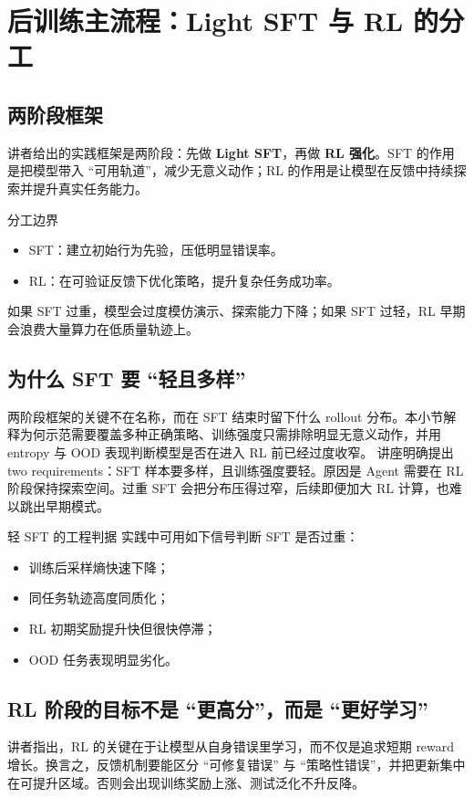 \section{后训练主流程：Light SFT 与 RL 的分工}

\subsection{两阶段框架}
讲者给出的实践框架是两阶段：先做 \textbf{Light SFT}，再做 \textbf{RL 强化}。SFT 的作用是把模型带入 ``可用轨道''，减少无意义动作；RL 的作用是让模型在反馈中持续探索并提升真实任务能力。

\begin{importantbox}{分工边界}
\begin{itemize}
    \item SFT：建立初始行为先验，压低明显错误率。
    \item RL：在可验证反馈下优化策略，提升复杂任务成功率。
\end{itemize}
如果 SFT 过重，模型会过度模仿演示、探索能力下降；如果 SFT 过轻，RL 早期会浪费大量算力在低质量轨迹上。
\end{importantbox}

\subsection{为什么 SFT 要 ``轻且多样''}
两阶段框架的关键不在名称，而在 SFT 结束时留下什么 rollout 分布。本小节解释为何示范需要覆盖多种正确策略、训练强度只需排除明显无意义动作，并用 entropy 与 OOD 表现判断模型是否在进入 RL 前已经过度收窄。
讲座明确提出 two requirements：SFT 样本要多样，且训练强度要轻。原因是 Agent 需要在 RL 阶段保持探索空间。过重 SFT 会把分布压得过窄，后续即便加大 RL 计算，也难以跳出早期模式。

\begin{knowledgebox}{轻 SFT 的工程判据}
实践中可用如下信号判断 SFT 是否过重：
\begin{itemize}
    \item 训练后采样熵快速下降；
    \item 同任务轨迹高度同质化；
    \item RL 初期奖励提升快但很快停滞；
    \item OOD 任务表现明显劣化。
\end{itemize}
\end{knowledgebox}

\subsection{RL 阶段的目标不是 ``更高分''，而是 ``更好学习''}
讲者指出，RL 的关键在于让模型从自身错误里学习，而不仅是追求短期 reward 增长。换言之，反馈机制要能区分 ``可修复错误'' 与 ``策略性错误''，并把更新集中在可提升区域。否则会出现训练奖励上涨、测试泛化不升反降。

